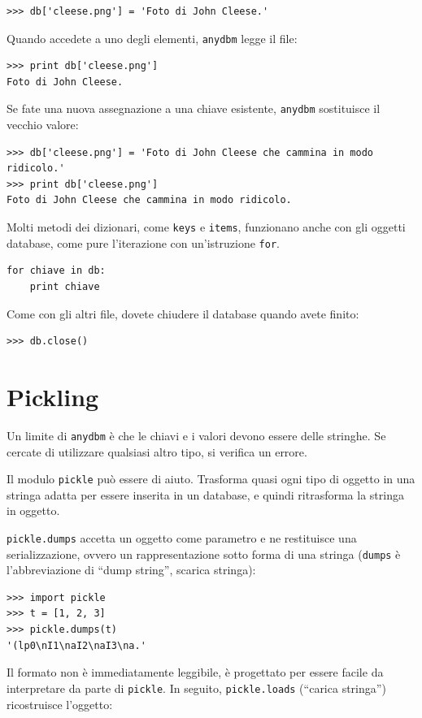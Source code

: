 \documentclass[10pt]{book}
\begin{document}
\begin{verbatim}
>>> db['cleese.png'] = 'Foto di John Cleese.'
\end{verbatim}
%
Quando accedete a uno degli elementi, {\tt anydbm} legge il file:

\begin{verbatim}
>>> print db['cleese.png']
Foto di John Cleese.
\end{verbatim}
%
Se fate una nuova assegnazione a una chiave esistente, {\tt anydbm} sostituisce il vecchio valore:

\begin{verbatim}
>>> db['cleese.png'] = 'Foto di John Cleese che cammina in modo ridicolo.'
>>> print db['cleese.png']
Foto di John Cleese che cammina in modo ridicolo.
\end{verbatim}
%
Molti metodi dei dizionari, come {\tt keys} e {\tt items}, funzionano anche con gli oggetti database, come pure l'iterazione con un'istruzione {\tt for}.

\begin{verbatim}
for chiave in db:
    print chiave
\end{verbatim}
%
Come con gli altri file, dovete chiudere il database quando avete finito:

\begin{verbatim}
>>> db.close()
\end{verbatim}
%


\section{Pickling}

Un limite di {\tt anydbm} è che le chiavi e i valori devono essere delle stringhe. Se cercate di utilizzare qualsiasi altro tipo, si verifica un errore.

Il modulo {\tt pickle} può essere di aiuto. Trasforma quasi ogni tipo di oggetto in una stringa adatta per essere inserita in un database, e quindi ritrasforma la stringa in oggetto.

{\tt pickle.dumps} accetta un oggetto come parametro e ne restituisce una serializzazione, ovvero un rappresentazione sotto forma di una stringa ({\tt dumps} è l'abbreviazione di ``dump string'', scarica stringa):

\begin{verbatim}
>>> import pickle
>>> t = [1, 2, 3]
>>> pickle.dumps(t)
'(lp0\nI1\naI2\naI3\na.'
\end{verbatim}
%
Il formato non è immediatamente leggibile, è progettato per essere facile da interpretare da parte di {\tt pickle}. In seguito, {\tt pickle.loads}
(``carica stringa'') ricostruisce l'oggetto:
\end{document}
